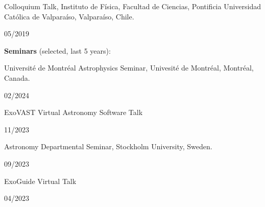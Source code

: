\documentclass[12pt, a4paper]{article} %
\begin{document}
\begin{minipage}[t]{0.7\textwidth}
\begin{flushleft}%
  \setlength{\leftskip}{0.2cm}%
Colloquium Talk, Instituto de F\'isica, Facultad de Ciencias, Pontificia Universidad Cat\'olica de Valpara\'iso, Valpara\'iso, Chile.
\end{flushleft}
\end{minipage}
\begin{minipage}[t]{0.3\textwidth}
\hfill 05/2019
\end{minipage}
\vspace{0.2cm}

\textbf{Seminars} (selected, last 5 years):\\

\begin{minipage}[t]{0.7\textwidth}
\begin{flushleft}%
  \setlength{\leftskip}{0.2cm}%
Universit\'e de Montr\'eal Astrophysics Seminar, Univesit\'e de Montr\'eal, Montr\'eal, Canada.
\end{flushleft}
\end{minipage}
\begin{minipage}[t]{0.3\textwidth}
\hfill 02/2024
\end{minipage}
\vspace{0.2cm}

\begin{minipage}[t]{0.7\textwidth}
\begin{flushleft}%
  \setlength{\leftskip}{0.2cm}%
ExoVAST Virtual Astronomy Software Talk
\end{flushleft}
\end{minipage}
\begin{minipage}[t]{0.3\textwidth}
\hfill 11/2023
\end{minipage}
\vspace{0.2cm}

\begin{minipage}[t]{0.7\textwidth}
\begin{flushleft}%
  \setlength{\leftskip}{0.2cm}%
Astronomy Departmental Seminar, Stockholm University, Sweden.
\end{flushleft}
\end{minipage}
\begin{minipage}[t]{0.3\textwidth}
\hfill 09/2023
\end{minipage}
\vspace{0.2cm}


\begin{minipage}[t]{0.7\textwidth}
\begin{flushleft}%
  \setlength{\leftskip}{0.2cm}%
ExoGuide Virtual Talk
\end{flushleft}
\end{minipage}
\begin{minipage}[t]{0.3\textwidth}
\hfill 04/2023
\end{minipage}
\vspace{0.2cm}
\end{document}
